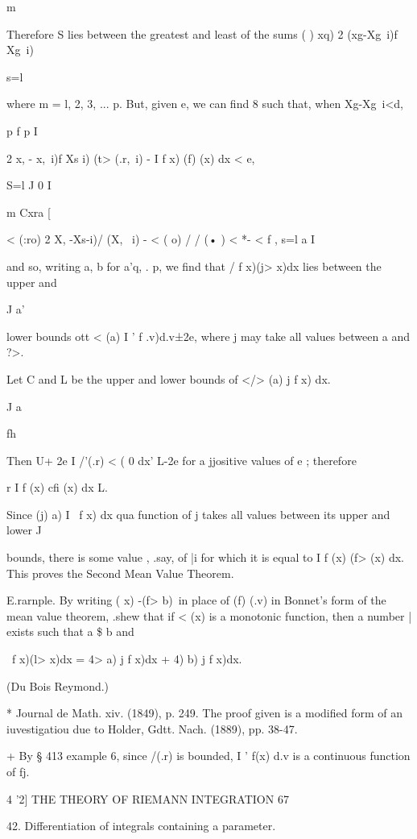 m 

Therefore S lies between the greatest and least of the sums ( ) xq) 2 (xg-Xg\ i)f Xg\ i) 

s=l 

where m = l, 2, 3, ... p. But, given e, we can find 8 such that, when Xg-Xg\ i<d, 

p f p I 

2  x, - x,\ i)f Xs i) (t> (.r,\ i) - I f x) (f) (x) dx < e, 

S=l J  0 I 

m Cxra [ 

<  (:ro) 2  X, -Xs-i)/ (X, \  i) - <  ( o) / / (• ) < *- < f , 
s=l   a  I 

and so, writing a, b for a'q, . p, we find that / f x)(j> x)dx lies between the upper and 

J a' 

lower bounds ott <  (a) I ' f .v)d.v±2e, where  j may take all values between a and ?>. 

Let C and L be the upper and lower bounds of </> (a) j f x) dx. 

J a 

fh 

Then U+ 2e   I /'(.r) <  ( 0 dx' L-2e for a  jjositive values of e ; therefore 

r  I f (x) cfi (x) dx   L. 

Since (j) a) I \ f  x) dx qua function of  j takes all values between its upper and lower 
J   

bounds, there is some value  , .say, of |i for which it is equal to I f (x) (f> (x) dx. This 
proves the Second Mean Value Theorem. 

E.rarnple. By writing (   x) -(f> b)\ in place of (f) (.v) in Bonnet's form of the mean 
value theorem, .shew that if <  (x) is a monotonic function, then a number | exists 
such that a  \$ b and 

\ f x)(l> x)dx = 4> a) j f x)dx + 4) b) j f x)dx. 

(Du Bois Reymond.) 

* Journal de Math. xiv. (1849), p. 249. The proof given is a modified form of an iuvestigatiou 
due to Holder, Gdtt. Nach. (1889), pp. 38-47. 

+ By § 413 example 6, since /(.r) is bounded, I ' f(x) d.v is a continuous function of fj. 



4 '2] THE THEORY OF RIEMANN INTEGRATION 67 

42. Differentiation of integrals containing a parameter. 

